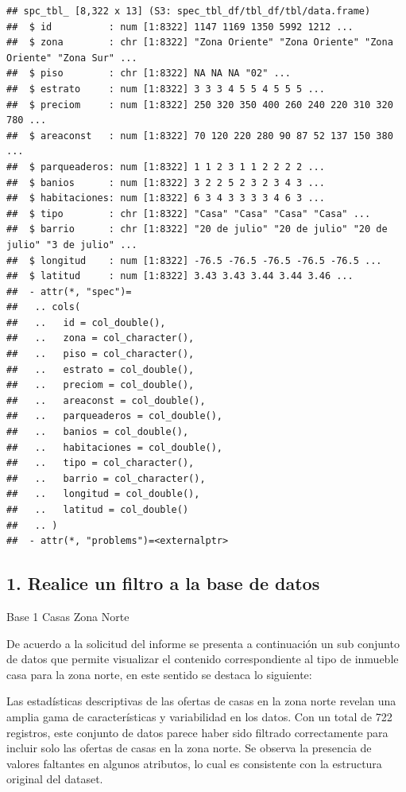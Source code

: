 \documentclass[
]{article}
\begin{document}
\begin{verbatim}
## spc_tbl_ [8,322 x 13] (S3: spec_tbl_df/tbl_df/tbl/data.frame)
##  $ id          : num [1:8322] 1147 1169 1350 5992 1212 ...
##  $ zona        : chr [1:8322] "Zona Oriente" "Zona Oriente" "Zona Oriente" "Zona Sur" ...
##  $ piso        : chr [1:8322] NA NA NA "02" ...
##  $ estrato     : num [1:8322] 3 3 3 4 5 5 4 5 5 5 ...
##  $ preciom     : num [1:8322] 250 320 350 400 260 240 220 310 320 780 ...
##  $ areaconst   : num [1:8322] 70 120 220 280 90 87 52 137 150 380 ...
##  $ parqueaderos: num [1:8322] 1 1 2 3 1 1 2 2 2 2 ...
##  $ banios      : num [1:8322] 3 2 2 5 2 3 2 3 4 3 ...
##  $ habitaciones: num [1:8322] 6 3 4 3 3 3 3 4 6 3 ...
##  $ tipo        : chr [1:8322] "Casa" "Casa" "Casa" "Casa" ...
##  $ barrio      : chr [1:8322] "20 de julio" "20 de julio" "20 de julio" "3 de julio" ...
##  $ longitud    : num [1:8322] -76.5 -76.5 -76.5 -76.5 -76.5 ...
##  $ latitud     : num [1:8322] 3.43 3.43 3.44 3.44 3.46 ...
##  - attr(*, "spec")=
##   .. cols(
##   ..   id = col_double(),
##   ..   zona = col_character(),
##   ..   piso = col_character(),
##   ..   estrato = col_double(),
##   ..   preciom = col_double(),
##   ..   areaconst = col_double(),
##   ..   parqueaderos = col_double(),
##   ..   banios = col_double(),
##   ..   habitaciones = col_double(),
##   ..   tipo = col_character(),
##   ..   barrio = col_character(),
##   ..   longitud = col_double(),
##   ..   latitud = col_double()
##   .. )
##  - attr(*, "problems")=<externalptr>
\end{verbatim}

\subsection{1. Realice un filtro a la base de
datos}\label{realice-un-filtro-a-la-base-de-datos}

Base 1 Casas Zona Norte

De acuerdo a la solicitud del informe se presenta a continuación un sub
conjunto de datos que permite visualizar el contenido correspondiente al
tipo de inmueble casa para la zona norte, en este sentido se destaca lo
siguiente:

Las estadísticas descriptivas de las ofertas de casas en la zona norte
revelan una amplia gama de características y variabilidad en los datos.
Con un total de 722 registros, este conjunto de datos parece haber sido
filtrado correctamente para incluir solo las ofertas de casas en la zona
norte. Se observa la presencia de valores faltantes en algunos
atributos, lo cual es consistente con la estructura original del
dataset.
\end{document}
